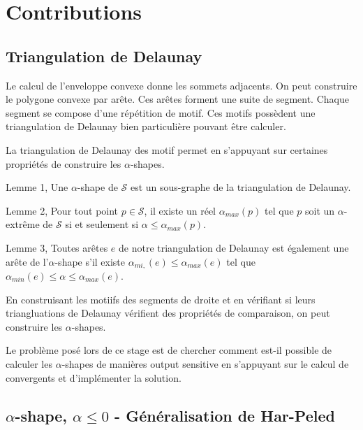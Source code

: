 \section{Contributions}

\subsection{Triangulation de Delaunay}

Le calcul de l'enveloppe convexe donne les sommets adjacents. On peut construire le polygone convexe par arête. Ces arêtes forment une suite de segment. Chaque segment se compose d'une répétition de motif. Ces motifs possèdent une triangulation de Delaunay bien particulière pouvant être calculer. \cite{RoussillonL11}


La triangulation de Delaunay des motif permet en s'appuyant sur certaines propriétés de construire les $\alpha$-shapes. \cite{EdKirSei83}

Lemme 1,
Une $\alpha$-shape de $\mathcal{S}$ est un sous-graphe de la triangulation de Delaunay.

Lemme 2,
Pour tout point $p \in \mathcal{S}$, il existe un réel $\alpha_{max}(p)$ tel que $p$ soit un $\alpha$-extrême de $\mathcal{S}$ si et seulement si $\alpha \leq \alpha_{max}(p)$.

Lemme 3,
Toutes arêtes $e$ de notre triangulation de Delaunay est également une arête de l'$\alpha$-shape s'il existe $\alpha_{mi,}(e) \leq \alpha_{max}(e)$ tel que $\alpha_{min}(e) \leq \alpha \leq \alpha_{max}(e)$.

En construisant les motiifs des segments de droite et en vérifiant si leurs triangluations de Delaunay vérifient des propriétés de comparaison, on peut construire les $\alpha$-shapes.

Le problème posé lors de ce stage est de chercher comment est-il possible de calculer les $\alpha$-shapes de manières output sensitive en s'appuyant sur le calcul de convergents et d'implémenter la solution.


\subsection{$\alpha$-shape, $\alpha \leq 0$ - Généralisation de Har-Peled}

